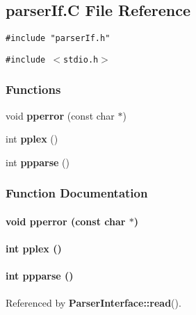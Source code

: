 \subsection{parser\-If.C File Reference}
\label{parserIf.C}
{\tt \#include "parser\-If.h"}\par
{\tt \#include $<$stdio.h$>$}\par
\subsubsection*{Functions}
\begin{CompactItemize}
\item 
void {\bf pperror} (const char $\ast$)
\item 
int {\bf pplex} ()
\item 
int {\bf ppparse} ()
\end{CompactItemize}


\subsubsection{Function Documentation}
\label{parserIf.C_a0}
\paragraph{\setlength{\rightskip}{0pt plus 5cm}void pperror (const char $\ast$)}\hfill

\label{parserIf.C_a1}
\paragraph{\setlength{\rightskip}{0pt plus 5cm}int pplex ()}\hfill

\label{parserIf.C_a2}
\paragraph{\setlength{\rightskip}{0pt plus 5cm}int ppparse ()}\hfill



Referenced by {\bf Parser\-Interface::read}().